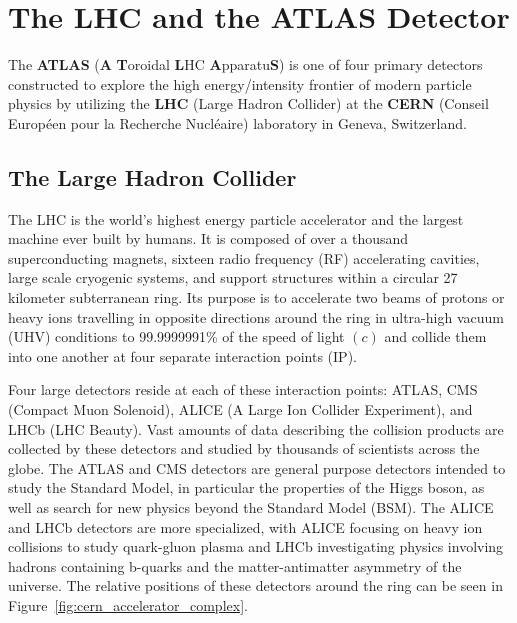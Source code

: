 \graphicspath{{Ch2_Experiment/figures/}}

\chapter{The LHC and the ATLAS Detector}

The \textbf{ATLAS} (\textbf{A} \textbf{T}oroidal \textbf{L}HC \textbf{A}pparatu\textbf{S}) is one of four primary detectors constructed to explore the high energy/intensity frontier of modern particle physics by utilizing the \textbf{LHC} (Large Hadron Collider) at the \textbf{CERN} (Conseil Européen pour la Recherche Nucléaire) laboratory in Geneva, Switzerland.


\section{The Large Hadron Collider}
The LHC is the world's highest energy particle accelerator and the largest machine ever built by humans.
It is composed of over a thousand superconducting magnets, sixteen radio frequency (RF) accelerating cavities, large scale cryogenic systems, and support structures within a circular 27 kilometer subterranean ring.
Its purpose is to accelerate two beams of protons or heavy ions travelling in opposite directions around the ring in ultra-high vacuum (UHV) conditions to 99.9999991\% of the speed of light $(c)$ and collide them into one another at four separate interaction points (IP).

Four large detectors reside at each of these interaction points: ATLAS, CMS (Compact Muon Solenoid), ALICE (A Large Ion Collider Experiment), and LHCb (LHC Beauty).
Vast amounts of data describing the collision products are collected by these detectors and studied by thousands of scientists across the globe.
The ATLAS and CMS detectors are general purpose detectors intended to study the Standard Model, in particular the properties of the Higgs boson, as well as search for new physics beyond the Standard Model (BSM).
The ALICE and LHCb detectors are more specialized, with ALICE focusing on heavy ion collisions to study quark-gluon plasma and LHCb investigating physics involving hadrons containing b-quarks and the matter-antimatter asymmetry of the universe.
The relative positions of these detectors around the ring can be seen in Figure~\ref{fig:cern_accelerator_complex}.

